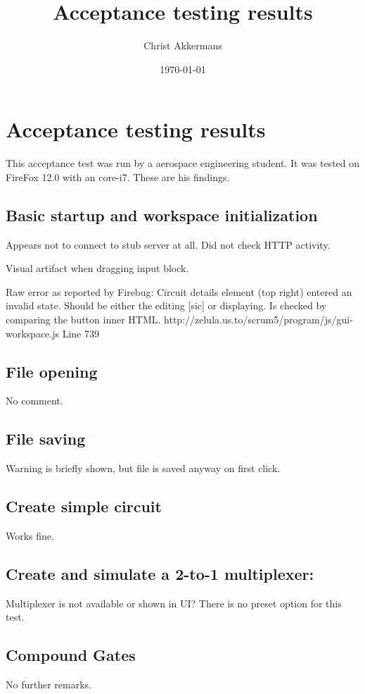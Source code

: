 \documentclass[a4paper]{article}
\begin{document}
\title{Acceptance testing results}
\author{Christ Akkermans}
\date{\today}
\maketitle



\section{Acceptance testing results}
This acceptance test was run by a aerospace engineering student. It was tested on FireFox 12.0 with an core-i7. 
These are his findings.

\subsection{Basic startup and workspace initialization}
Appears not to connect to stub server at all. Did not check HTTP activity.

Visual artifact when dragging input block.

Raw error as reported by Firebug:
Circuit details element (top right) entered an invalid state. Should be either the editing [sic] or displaying. Is checked by comparing the button inner HTML.
http://zelula.us.to/scrum5/program/js/gui-workspace.js
Line 739


\subsection{File opening}
No comment.

\subsection{File saving}
Warning is briefly shown, but file is saved anyway on first click.

\subsection{Create simple circuit}
Works fine.

\subsection{Create and simulate a 2-to-1 multiplexer:}
Multiplexer is not available or shown in UI? There is no preset option for this test.

\subsection{Compound Gates}
No further remarks.
\end{document}
